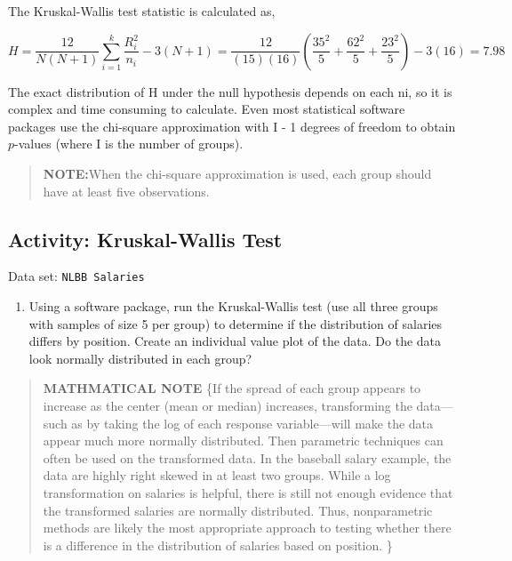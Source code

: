 \documentclass[
]{book}
\providecommand{\tightlist}{%
  \setlength{\itemsep}{0pt}\setlength{\parskip}{0pt}}
\begin{document}
The Kruskal-Wallis test statistic is calculated as,

\begin{equation} 
  H = \frac{12}{N(N + 1)} \sum_{i=1}^k \frac{R_i^2}{n_i} - 3(N + 1) = \frac{12}{(15)(16)}(\frac{35^2}{5}+\frac{62^2}{5}+\frac{23^2}{5}) -3(16) =7.98
  \tag{1.5} \label{eq:1_5}
\end{equation}

The exact distribution of H under the null hypothesis depends on each ni, so it is complex and time consuming to calculate. Even most statistical software packages use the chi-square approximation with I - 1 degrees of freedom to obtain \(p\)-values (where I is the number of groups).

\begin{quote}
\textbf{NOTE:}When the chi-square approximation is used, each group should have at least five observations.
\end{quote}

\hypertarget{activity-kruskal-wallis-test}{%
\subsection*{Activity: Kruskal-Wallis Test}\label{activity-kruskal-wallis-test}}

Data set: \texttt{NLBB\ Salaries}

\begin{enumerate}
\def\labelenumi{\arabic{enumi}.}
\setcounter{enumi}{27}
\tightlist
\item
  Using a software package, run the Kruskal-Wallis test (use all three groups with samples of size 5 per group) to determine if the distribution of salaries differs by position. Create an individual value plot of the data. Do the data look normally distributed in each group?
\end{enumerate}

\begin{quote}
\textbf{MATHMATICAL NOTE} \{If the spread of each group appears to increase as the center (mean or median) increases, transforming the data---such as by taking the log of each response variable---will make the data appear much more normally distributed. Then parametric techniques can often be used on the transformed data. In the baseball salary example, the data are highly right skewed in at least two groups. While a log transformation on salaries is helpful, there is still not enough evidence that the transformed salaries are normally distributed. Thus, nonparametric methods are likely the most appropriate approach to testing whether there is a difference in the distribution of salaries based on position.
\}
\end{quote}
\end{document}
